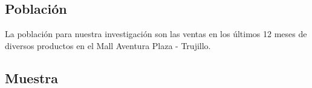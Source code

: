 \subsection{Población}
La población para nuestra investigación son las ventas en los últimos 12 meses de diversos productos en el Mall Aventura Plaza - Trujillo.

\subsection{Muestra}

